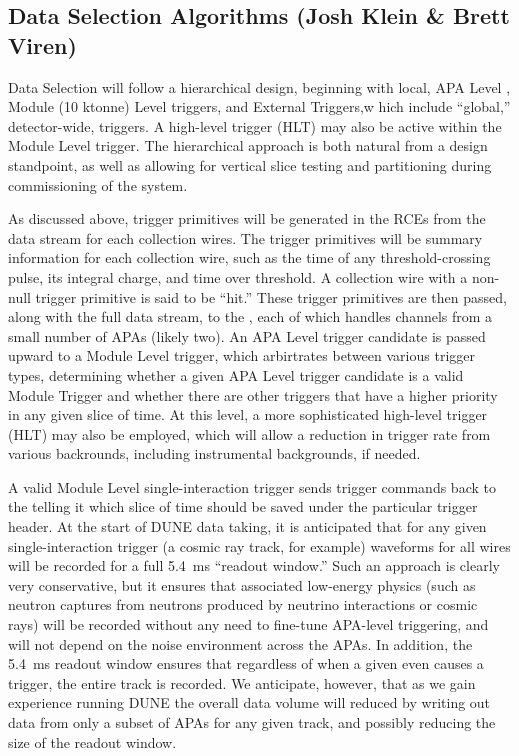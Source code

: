\subsection{Data Selection Algorithms (Josh Klein \& Brett Viren)}
\label{sec:fdsp-daq-sel}


	Data Selection will follow a hierarchical design, beginning with local,
APA Level , Module (10 ktonne) Level triggers, and External
Triggers,w hich include ``global,'' detector-wide, triggers. A high-level
trigger (HLT) may also be active within the Module Level trigger.  The
hierarchical approach is both natural from a design standpoint, as well as
allowing for vertical slice testing and partitioning during commissioning of
the system.

	As discussed above, trigger primitives will be generated in the RCEs
from the data stream for each collection wires.  The trigger primitives will be
summary information for each collection wire, such as the time of any
threshold-crossing pulse, its integral charge, and time over threshold.  A
collection wire with a non-null trigger primitive is said to be ``hit.''  These
trigger primitives are then passed, along with the full data stream, to the
, each of which handles channels from a small
number of APAs (likely two).  An APA Level trigger candidate is passed upward to
a Module Level trigger, which arbirtrates between various trigger types,
determining whether a given APA Level trigger candidate is a valid Module
Trigger and whether there are other triggers that have a higher priority in any
given slice of time.  At this level, a more sophisticated high-level trigger
(HLT) may also be employed, which will allow a reduction in trigger rate from
various backrounds, including instrumental backgrounds, if needed. 

	A valid Module Level single-interaction trigger sends trigger commands
back to the  telling it which slice of time should be saved under
the particular trigger header.  At the start of DUNE data taking, it is
anticipated that for any given single-interaction trigger (a cosmic ray track,
for example) waveforms for all wires will be recorded for a full 5.4~ms
``readout window.'' Such an approach is clearly very conservative, but it
ensures that associated low-energy physics (such as neutron captures from
neutrons produced by neutrino interactions or cosmic rays) will be recorded
without any need to fine-tune APA-level triggering, and will not depend on
the noise environment across the APAs. In addition, the 5.4~ms readout window
ensures that regardless of when a given even causes a trigger, the entire track
is recorded.  We anticipate, however, that as we gain experience running DUNE
the overall data volume will reduced by writing out data from only a
subset of APAs for any given track, and possibly reducing the size of the
readout window.

